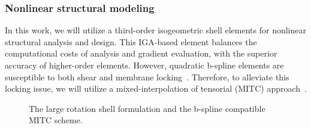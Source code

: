 \documentclass[]{aiaa-tc}
\begin{document}
\subsubsection{Nonlinear structural modeling}

In this work, we will utilize a third-order isogeometric shell
elements for nonlinear structural analysis and design.  This IGA-based
element balances the computational costs of analysis and gradient
evaluation, with the superior accuracy of higher-order
elements. However, quadratic b-spline elements are susceptible to both
shear and membrane locking~\cite{Babuska:1992:OLR,
  Chapelle.Bathe}. Therefore, to alleviate this locking issue, we will
utilize a mixed-interpolation of tensorial (MITC)
approach~\cite{Dvorkin:1984:CMB, Bucalem:1993:HOM}.

\begin{figure}[h]
  \centering
  \caption{The large rotation shell formulation and the b-spline
    compatible MITC scheme.}
  \label{fig:shell-figs}
\end{figure}
\end{document}
